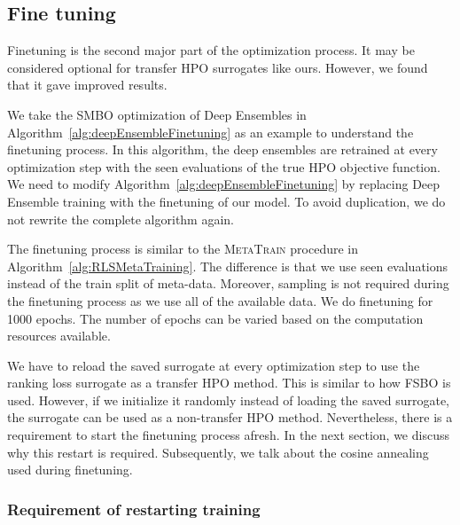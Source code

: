 \documentclass[12pt, twoside, ngerman]{report}
\begin{document}
\subsection{Fine tuning}\label{sec:rlfinetune}
Finetuning is the second major part of the optimization process.
It may be considered optional for transfer HPO surrogates like ours.
However, we found that it gave improved results.

We take the SMBO optimization of Deep Ensembles in Algorithm~\ref{alg:deepEnsembleFinetuning} as an example to understand the finetuning process.
In this algorithm, the deep ensembles are retrained at every optimization step with the seen evaluations of the true HPO objective function.
We need to modify Algorithm~\ref{alg:deepEnsembleFinetuning} by replacing Deep Ensemble training with the finetuning of our model.
To avoid duplication, we do not rewrite the complete algorithm again.

The finetuning process is similar to the \textsc{MetaTrain} procedure in Algorithm~\ref{alg:RLSMetaTraining}.
The difference is that we use seen evaluations instead of the train split of meta-data. Moreover, sampling is not required during the finetuning process as we use all of the available data.
We do finetuning for 1000 epochs.
The number of epochs can be varied based on the computation resources available.

We have to reload the saved surrogate at every optimization step to use the ranking loss surrogate as a transfer HPO method. This is similar to how FSBO is used.
However, if we initialize it randomly instead of loading the saved surrogate, the surrogate can be used as a non-transfer HPO method.
Nevertheless, there is a requirement to start the finetuning process afresh. In the next section, we discuss why this restart is required.
Subsequently, we talk about the cosine annealing used during finetuning.


\subsubsection{Requirement of restarting training}\label{sec:restart}
\end{document}
